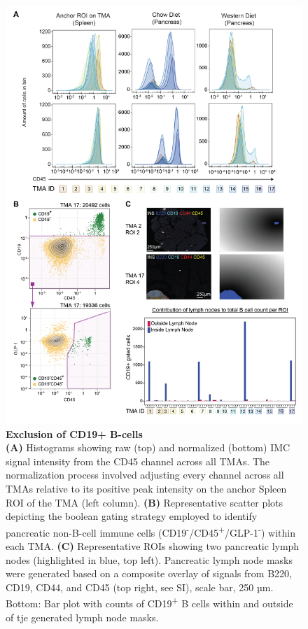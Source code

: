\begin{figure}[!t]
    \centering
    \includegraphics[width=14cm]{Appendix2/Fig/F2-A2-01.png}
    \caption[imc-anchorbcell]{\textbf{Exclusion of CD19+ B-cells}\\
    \textbf{(A)} Histograms showing raw (top) and normalized (bottom) IMC signal intensity from the CD45 channel across all TMAs. The normalization process involved adjusting every channel across all TMAs relative to its positive peak intensity on the anchor Spleen ROI of the TMA (left column). \textbf{(B)} Representative scatter plots depicting the boolean gating strategy employed to identify pancreatic non-B-cell immune cells (CD19\textsuperscript{-}/CD45\textsuperscript{+}/GLP-1\textsuperscript{-}) within each TMA. \textbf{(C)} Representative ROIs showing two pancreatic lymph nodes (highlighted in blue, top left). Pancreatic lymph node masks were generated based on a composite overlay of signals from  B220, CD19, CD44, and CD45 (top right, see SI), scale bar, 250 µm. Bottom: Bar plot with counts of CD19\textsuperscript{+} B cells within and outside of tje generated lymph node masks.}
    \label{suppl_fig:imc_anchorbcell}
\end{figure}

